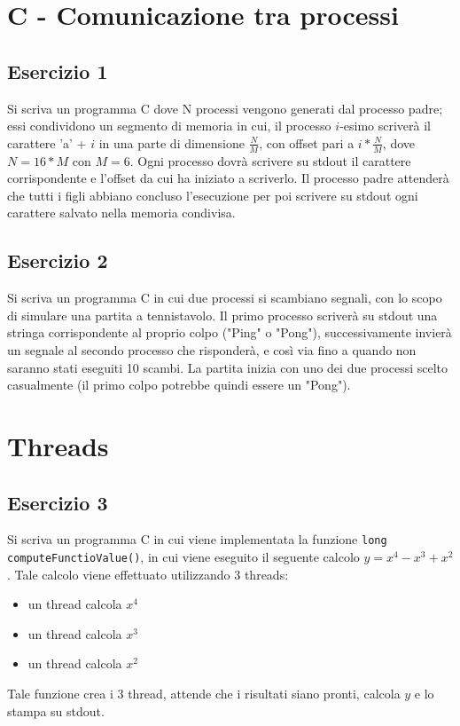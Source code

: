 \documentclass{article}
\def\code#1{\texttt{#1}}
\begin{document}
\section*{C - Comunicazione tra processi}
\subsection*{Esercizio 1}
Si scriva un programma C dove N processi vengono generati dal processo padre; essi condividono un segmento di memoria in cui, il processo $i$-esimo scriverà il carattere 'a' + $i$ in una parte di dimensione $\frac{N}{M}$, con offset pari a $i * \frac{N}{M}$, dove $N = 16 * M$ con $M = 6$. Ogni processo dovrà scrivere su stdout il carattere corrispondente e l'offset da cui ha iniziato a scriverlo. Il processo padre attenderà che tutti i figli abbiano concluso l'esecuzione per poi scrivere su stdout ogni carattere salvato nella memoria condivisa.

\subsection*{Esercizio 2}
Si scriva un programma C in cui due processi si scambiano segnali, con lo scopo di simulare una partita a tennistavolo. Il primo processo scriverà su stdout una stringa corrispondente al proprio colpo ("Ping" o "Pong"), successivamente invierà un segnale al secondo processo che risponderà, e così via fino a quando non saranno stati eseguiti 10 scambi. La partita inizia con uno dei due processi scelto casualmente (il primo colpo potrebbe quindi essere un "Pong").

\section*{Threads}
\subsection*{Esercizio 3}
Si scriva un programma C in cui viene implementata la funzione \code{long computeFunctioValue()}, in cui viene eseguito il seguente calcolo $y = x^4 - x^3 + x^2$. Tale calcolo viene  effettuato utilizzando 3 threads:
\begin{itemize}
\item un thread calcola $x^4$
\item un thread calcola $x^3$
\item un thread calcola $x^2$
\end{itemize}
Tale funzione crea i 3 thread, attende che i risultati siano pronti, calcola $y$ e lo stampa su stdout.
\end{document}

